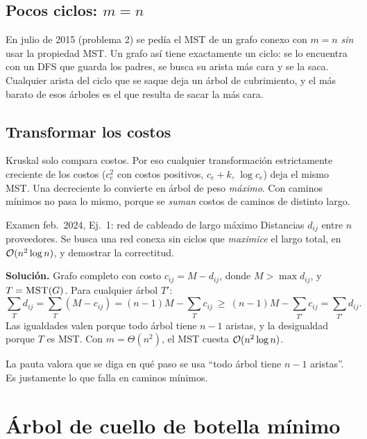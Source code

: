 \subsection{Pocos ciclos: \texorpdfstring{$m=n$}{m=n}}

En julio de 2015 (problema 2) se pedía el MST de un grafo conexo con $m=n$ \emph{sin} usar la propiedad MST. Un grafo así tiene exactamente un ciclo: se lo encuentra con un DFS que guarda los padres, se busca su arista más cara y se la saca. Cualquier arista del ciclo que se saque deja un árbol de cubrimiento, y el más barato de esos árboles es el que resulta de sacar la más cara.

\subsection{Transformar los costos}\label{gr:transf}

Kruskal solo compara costos. Por eso cualquier transformación estrictamente creciente de los costos ($c_e^2$ con costos positivos, $c_e+k$, $\log c_e$) deja el mismo MST. Una decreciente lo convierte en árbol de peso \emph{máximo}. Con caminos mínimos no pasa lo mismo, porque se \emph{suman} costos de caminos de distinto largo.

\begin{problema}{Examen feb.~2024, Ej.~1: red de cableado de largo máximo}
Distancias $d_{ij}$ entre $n$ proveedores. Se busca una red conexa sin ciclos que \emph{maximice} el largo total, en $\mathcal{O}(n^2\log n)$, y demostrar la correctitud.

\smallskip
\textbf{Solución.} Grafo completo con costo $c_{ij}=M-d_{ij}$, donde $M>\max d_{ij}$, y $T=\textsc{MST}(G)$. Para cualquier árbol $T'$:
\[ \textstyle\sum_{T}d_{ij}=\sum_{T}(M-c_{ij})=(n-1)M-\sum_T c_{ij}\ \ge\ (n-1)M-\sum_{T'}c_{ij}=\sum_{T'}d_{ij}. \]
Las igualdades valen porque todo árbol tiene $n-1$ aristas, y la desigualdad porque $T$ es MST. Con $m=\Theta(n^2)$, el MST cuesta $\mathcal{O}(n^2\log n)$.
\end{problema}

La pauta valora que se diga en qué paso se usa ``todo árbol tiene $n-1$ aristas''. Es justamente lo que falla en caminos mínimos.

\section{Árbol de cuello de botella mínimo}

